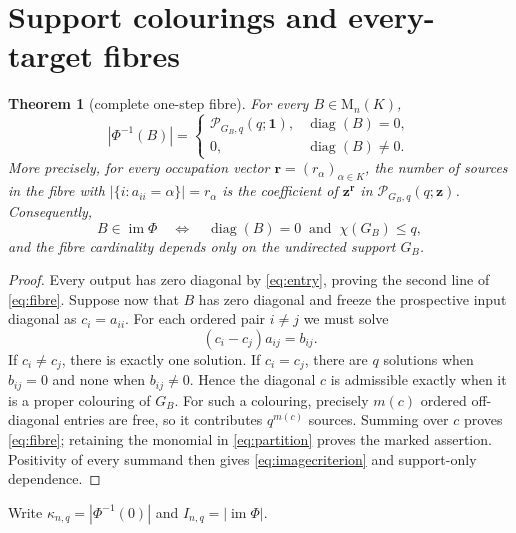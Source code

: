 \documentclass[a4paper,10pt]{amsart}
\newtheorem{theorem}{Theorem}
\theoremstyle{remark}
\newcommand{\Mat}{\mathrm M}
\newcommand{\im}{\operatorname{im}}
\begin{document}
\section{Support colourings and every-target fibres}

\begin{theorem}[complete one-step fibre]\label{thm:fibre}
For every $B\in\Mat_n(K)$,
\begin{equation}\label{eq:fibre}
 |\Phi^{-1}(B)|=
 \begin{cases}
  \mathcal P_{G_B,q}(q;\boldsymbol 1),&\operatorname{diag}(B)=0,\\
  0,&\operatorname{diag}(B)\ne0.
 \end{cases}
\end{equation}
More precisely, for every occupation vector
$\boldsymbol r=(r_\alpha)_{\alpha\in K}$, the number of sources in the
fibre with $|\{i:a_{ii}=\alpha\}|=r_\alpha$ is the coefficient of
$\boldsymbol z^{\boldsymbol r}$ in
$\mathcal P_{G_B,q}(q;\boldsymbol z)$.  Consequently,
\begin{equation}\label{eq:imagecriterion}
 B\in\im\Phi
 \quad\Longleftrightarrow\quad
 \operatorname{diag}(B)=0\ \text{ and }\ \chi(G_B)\le q,
\end{equation}
and the fibre cardinality depends only on the undirected support $G_B$.
\end{theorem}

\begin{proof}
Every output has zero diagonal by \eqref{eq:entry}, proving the second line
of \eqref{eq:fibre}.  Suppose now that $B$ has zero diagonal and freeze the
prospective input diagonal as $c_i=a_{ii}$.  For each ordered pair $i\ne j$
we must solve
\begin{equation}\label{eq:scalar}
 (c_i-c_j)a_{ij}=b_{ij}.
\end{equation}
If $c_i\ne c_j$, there is exactly one solution.  If $c_i=c_j$, there are
$q$ solutions when $b_{ij}=0$ and none when $b_{ij}\ne0$.  Hence the
diagonal $c$ is admissible exactly when it is a proper colouring of $G_B$.
For such a colouring, precisely $m(c)$ ordered off-diagonal entries are
free, so it contributes $q^{m(c)}$ sources.  Summing over $c$ proves
\eqref{eq:fibre}; retaining the monomial in \eqref{eq:partition} proves the
marked assertion.  Positivity of every summand then gives
\eqref{eq:imagecriterion} and support-only dependence.
\end{proof}

Write $\kappa_{n,q}=|\Phi^{-1}(0)|$ and $I_{n,q}=|\im\Phi|$.
\end{document}
